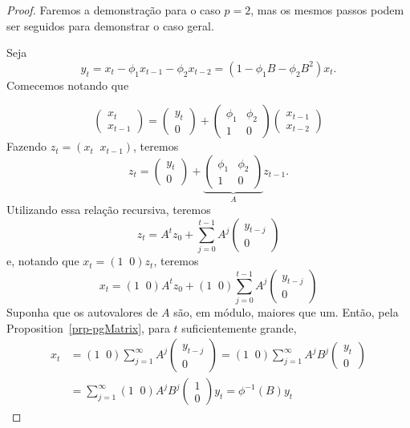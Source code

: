 \documentclass[
  letterpaper,
  DIV=11,
  numbers=noendperiod]{scrreprt}
\theoremstyle{definition}
\theoremstyle{plain}
\theoremstyle{definition}
\theoremstyle{plain}
\theoremstyle{remark}
\begin{document}
\begin{proof}

Faremos a demonstração para o caso \(p=2\), mas os mesmos passos podem
ser seguidos para demonstrar o caso geral.

Seja \[y_t=x_t-\phi_1x_{t-1}-\phi_2 x_{t-2}=(1-\phi_1B-\phi_2 B^2)x_t.\]
Comecemos notando que

\[\left(\begin{array}{c} x_t \\ x_{t-1}\end{array}\right)=\left(\begin{array}{c} y_t \\ 0\end{array}\right)+\left(\begin{array}{cc} \phi_1 & \phi_2 \\ 1 & 0\end{array}\right)\left(\begin{array}{c} x_{t-1} \\ x_{t-2}\end{array}\right)\]
Fazendo \(z_t=(x_t\;\;x_{t-1})\), teremos
\[z_t=\left(\begin{array}{c} y_t \\ 0\end{array}\right)+\underbrace{\left(\begin{array}{cc} \phi_1 & \phi_2 \\ 1 & 0\end{array}\right)}_{A}z_{t-1}.\]
Utilizando essa relação recursiva, teremos
\[z_t=A^t z_{0}+\sum_{j=0}^{t-1}A^j\left(\begin{array}{c} y_{t-j} \\ 0\end{array}\right)\]
e, notando que \(x_t=(1\;\;0)z_t\), teremos
\[x_t=(1\;\;0)A^t z_{0}+(1\;\;0)\sum_{j=0}^{t-1}A^j\left(\begin{array}{c} y_{t-j} \\ 0\end{array}\right)\]
Suponha que os autovalores de \(A\) são, em módulo, maiores que um.
Então, pela Proposition~\ref{prp-pgMatrix}, para \(t\) suficientemente
grande,
\[\begin{align}x_t&=(1\;\;0)\sum_{j=1}^\infty A^j \left(\begin{array}{c} y_{t-j} \\ 0\end{array}\right)=(1\;\;0)\sum_{j=1}^\infty A^j B^j\left(\begin{array}{c} y_{t} \\ 0\end{array}\right)\\&=\sum_{j=1}^\infty (1\;\;0)A^j B^j\left(\begin{array}{c} 1 \\ 0\end{array}\right)y_{t}=\phi^{-1}(B)y_t\end{align}\]

\end{proof}
\end{document}

